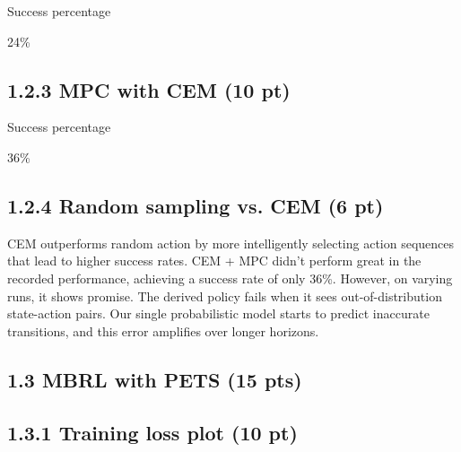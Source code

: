 \documentclass[12pt]{article}
\begin{document}
Success percentage
\begin{tcolorbox}[fit,height=1cm, width=5cm, blank, borderline={1pt}{1pt},nobeforeafter, valign=center]
\begin{center}
     \large{24\%}
\end{center}
\end{tcolorbox}

\subsection*{1.2.3 MPC with CEM (10 pt)}

Success percentage
\begin{tcolorbox}[fit,height=1cm, width=5cm, blank, borderline={1pt}{1pt},nobeforeafter, valign=center]
\begin{center}
    \large{36\%}
\end{center}
\end{tcolorbox}

\subsection*{1.2.4 Random sampling vs. CEM  (6 pt)}

\begin{tcolorbox}[fit,height=15em, width=40em, blank, borderline={1pt}{1pt},nobeforeafter, valign=center]
\begin{center}
CEM outperforms random action by more intelligently selecting action sequences that lead to higher success rates. CEM + MPC didn't perform great in the recorded performance, achieving a success rate of only 36\%. However, on varying runs, it shows promise. The derived policy fails when it sees out-of-distribution state-action pairs. Our single probabilistic model starts to predict inaccurate transitions, and this error amplifies over longer horizons.
  
\end{center}
\end{tcolorbox}


\subsection*{1.3 MBRL with PETS (15 pts)}

\subsection*{1.3.1 Training loss plot (10 pt)}
\end{document}
